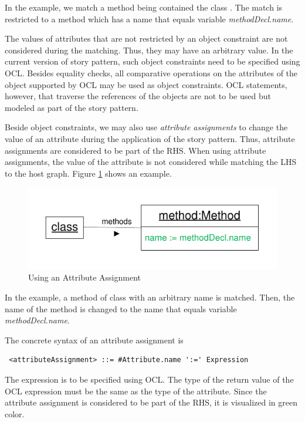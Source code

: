 In the example, we match a method being contained the class . The match is restricted to a method which has a name that equals variable \emph{methodDecl.name}.

The values of attributes that are not restricted by an object constraint are not considered during the matching. Thus, they may have an arbitrary value. In the current version of story pattern, such object constraints need to be specified using OCL. Besides equality checks, all comparative operations on the attributes of the object supported by OCL may be used as object constraints. OCL statements, however, that traverse the references of the objects are not to be used but modeled as part of the story pattern.

Beside object constraints, we may also use \emph{attribute assignments} to change the value of an attribute during the application of the story pattern. Thus, attribute assignments are considered to be part of the RHS. When using attribute assignments, the value of the attribute is not considered while matching the LHS to the host graph. Figure \ref{fig:attributeAssignment} shows an example.

\begin{figure}[htbp]
  \centering
  \includegraphics[scale=1]{figures/AttributeAssignment}
  \caption{Using an Attribute Assignment}
  \label{fig:attributeAssignment}
\end{figure}

In the example, a method of class  with an arbitrary name is matched. Then, the name of the method is changed to the name that equals variable \emph{methodDecl.name}. 

The concrete syntax of an attribute assignment is
\begin{lstlisting}
 <attributeAssignment> ::= #Attribute.name ':=' Expression
\end{lstlisting}
The expression is to be specified using OCL. The type of the return value of the OCL expression must be the same as the type of the attribute. Since the attribute assignment is considered to be part of the RHS, it is visualized in green color.


